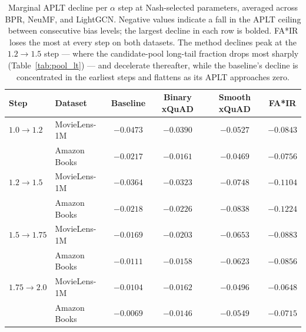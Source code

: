 \begin{table}[htbp]
\centering
\caption{Marginal APLT decline per $\alpha$ step at Nash-selected
parameters, averaged across BPR, NeuMF, and LightGCN. Negative values
indicate a fall in the APLT ceiling between consecutive bias levels; the
largest decline in each row is bolded. FA*IR loses the most at every
step on both datasets. The method declines peak at the $1.2\to1.5$ step
--- where the candidate-pool long-tail fraction drops most sharply
(Table~\ref{tab:pool_lt}) --- and decelerate thereafter, while the
baseline's decline is concentrated in the earliest steps and flattens as
its APLT approaches zero.}
\label{tab:marginal_sensitivity}
\begin{tabular}{llcccc}
\toprule
Step & Dataset & Baseline & Binary xQuAD & Smooth xQuAD & FA*IR \\
\midrule
$1.0\to1.2$ & MovieLens-1M & $-0.0473$ & $-0.0390$ & $-0.0527$ & $\mathbf{-0.0843}$ \\
\rowcolor{gray!6}  & Amazon Books & $-0.0217$ & $-0.0161$ & $-0.0469$ & $\mathbf{-0.0756}$ \\
\midrule
$1.2\to1.5$ & MovieLens-1M & $-0.0364$ & $-0.0323$ & $-0.0748$ & $\mathbf{-0.1104}$ \\
\rowcolor{gray!6}  & Amazon Books & $-0.0218$ & $-0.0226$ & $-0.0838$ & $\mathbf{-0.1224}$ \\
\midrule
$1.5\to1.75$ & MovieLens-1M & $-0.0169$ & $-0.0203$ & $-0.0653$ & $\mathbf{-0.0883}$ \\
\rowcolor{gray!6}  & Amazon Books & $-0.0111$ & $-0.0158$ & $-0.0623$ & $\mathbf{-0.0856}$ \\
\midrule
$1.75\to2.0$ & MovieLens-1M & $-0.0104$ & $-0.0162$ & $-0.0496$ & $\mathbf{-0.0648}$ \\
\rowcolor{gray!6}  & Amazon Books & $-0.0069$ & $-0.0146$ & $-0.0549$ & $\mathbf{-0.0715}$ \\
\bottomrule
\end{tabular}
\end{table}
